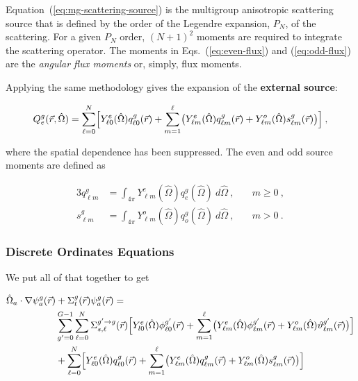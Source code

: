 \documentclass[12pt]{article}
\newcommand{\Macro}{\ensuremath{\Sigma}}
\newcommand{\vecr}{\ensuremath{\vec{r}}}
\newcommand{\vOmega}{\ensuremath{\hat{\Omega}}}
\newcommand{\evenp}{\ensuremath{\phi^{g'}}}
\newcommand{\oddp}{\ensuremath{\vartheta^{g'}}}
\newcommand{\sigg}[1]{\ensuremath{\Macro^{g'\rightarrow g}_{s,#1}}}
\begin{document}
Equation~(\ref{eq:mg-scattering-source}) is the multigroup anisotropic
scattering source that is defined by the order of the Legendre expansion,
$P_N$, of the scattering.  For a given $P_N$ order, $(N+1)^2$ moments are
required to integrate the scattering operator.  The moments in
Eqs.~(\ref{eq:even-flux}) and (\ref{eq:odd-flux}) are the \textit{angular flux 
moments} or, simply, flux moments.
  
Applying the same methodology gives the expansion of the \textbf{external 
source}:

\begin{equation}
  Q^g_e(\vec{r}, \vOmega) = \sum_{\ell=0}^{N}\Bigl[
  Y^e_{\ell0}(\vOmega)q^g_{\ell0}(\vec{r}) +
  \sum_{m=1}^{\ell}
  \bigr(
  Y^e_{\ell m}(\vOmega)q^g_{\ell m}(\vec{r}) + Y^o_{\ell m}(\vOmega)s^g_{\ell m}(\vec{r})\bigr)
  \Bigr]\:,
  \label{eq:mg-external-source}
\end{equation}

where the spatial dependence has been suppressed.  The even and odd source
moments are defined as

\begin{alignat}{3}
  q^g_{\ell m} &= \int_{4\pi}Y^e_{\ell m}(\vOmega)q^g_e(\vOmega)\:d\vOmega\:,
  \quad&m\ge 0\:,\label{eq:even-source}\\
  s^g_{\ell m} &= \int_{4\pi}Y^o_{\ell m}(\vOmega)q^g_o(\vOmega)\:d\vOmega\:,
  \quad&m>0\:.\label{eq:odd-source}
\end{alignat}

\subsubsection*{Discrete Ordinates Equations}

We put all of that together to get

\begin{align*}
\vOmega_a \cdot \nabla \psi^g_a(\vecr) &+ \Sigma^g_t(\vecr)\psi^g_a(\vecr) = \\
&\sum_{g'=0}^{G-1}
  \sum_{\ell=0}^N
  \sigg{\ell}(\vec{r})
  \Bigl[
  Y^e_{l0}(\vOmega)\evenp_{\ell0}(\vec{r}) +
  \sum_{m=1}^\ell
  \bigl(
  Y^e_{\ell m}(\vOmega)\evenp_{\ell m}(\vec{r}) +
  Y^o_{\ell m}(\vOmega)\oddp_{\ell m}(\vec{r})
  \bigr)\Bigr]\\
&+\sum_{\ell=0}^{N}\Bigl[
  Y^e_{\ell0}(\vOmega)q^g_{\ell0}(\vec{r}) +
  \sum_{m=1}^{\ell}
  \bigr(
  Y^e_{\ell m}(\vOmega)q^g_{\ell m}(\vec{r}) + Y^o_{\ell m}(\vOmega)s^g_{\ell m}(\vec{r})\bigr)
  \Bigr]
\end{align*}
\end{document}
